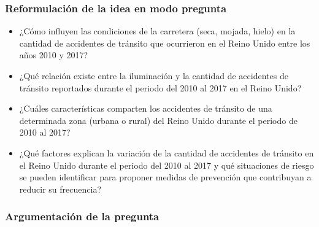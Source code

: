 \documentclass[12pt]{article}
\begin{document}
\subsubsection{Reformulación de la idea en modo pregunta}
\begin{itemize}
    \item[1.] ¿Cómo influyen las condiciones de la carretera (seca, mojada, hielo) en la cantidad de accidentes de tránsito que ocurrieron en el Reino Unido entre los años 2010 y 2017? 

    \item[2.] ¿Qué relación existe entre la iluminación y la cantidad de accidentes de tránsito reportados durante el periodo del 2010 al 2017 en el Reino Unido? 

    \item[3.] ¿Cuáles características comparten los accidentes de tránsito de una determinada zona (urbana o rural) del Reino Unido durante el periodo de 2010 al 2017?

    \item[4.] ¿Qué factores explican la variación de la cantidad de accidentes de tránsito en el Reino Unido durante el periodo del 2010 al 2017 y qué situaciones de riesgo se pueden identificar para proponer medidas de prevención que contribuyan a reducir su frecuencia?
   
\end{itemize}

\subsubsection{Argumentación de la pregunta}
\end{document}
